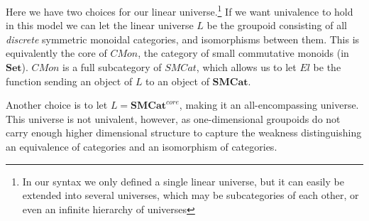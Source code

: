   
  Here we have two choices for our linear universe.\footnote{In our syntax we only defined a single linear universe, but it can easily be extended into several universes, which may be subcategories of each other, or even an infinite hierarchy of universes}
  If we want univalence to hold in this model we can let the linear universe $L$ be the groupoid consisting of all \textit{discrete} symmetric monoidal categories, and isomorphisms between them. This is equivalently the core of $CMon$, the category of small commutative monoids (in $\mathbf{Set}$). $CMon$ is a full subcategory of $SMCat$, which allows us to let $El$ be the function sending an object of $L$ to an object of $\mathbf{SMCat}$.

  
  Another choice is to let $L = \mathbf{SMCat}^{core}$, making it an all-encompassing universe. This universe is not univalent, however, as one-dimensional groupoids do not carry enough higher dimensional structure to capture the weakness distinguishing an equivalence of categories and an isomorphism of categories.  
